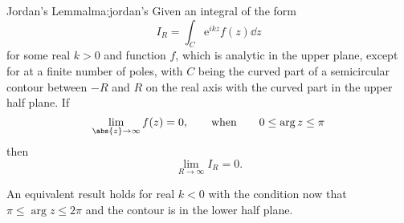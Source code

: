 \documentclass[fleqn]{NotesClass}
\newcommand*{\e}{\mathrm{e}}
\begin{document}
    \begin{lma}{Jordan's Lemma}{lma:jordan's}
        Given an integral of the form 
        \begin{equation}
            I_R = \int_C \e^{ikz}f(z) \dd{z}
        \end{equation}
        for some real \(k > 0\) and function \(f\), which is analytic in the upper plane, except for at a finite number of poles, with \(C\) being the curved part of a semicircular contour between \(-R\) and \(R\) on the real axis with the curved part in the upper half plane.
        If
        \begin{equation}
            \lim_{\abs{z} \to\infty} f(z) = 0, \qquad\text{when}\qquad 0 \le \arg z \le \pi
        \end{equation}
        then
        \begin{equation}
            \lim_{R\to\infty} I_R = 0.
        \end{equation}
        
        An equivalent result holds for real \(k < 0\) with the condition now that \(\pi \le \arg z \le 2\pi\) and the contour is in the lower half plane.
    \end{lma}
\end{document}
